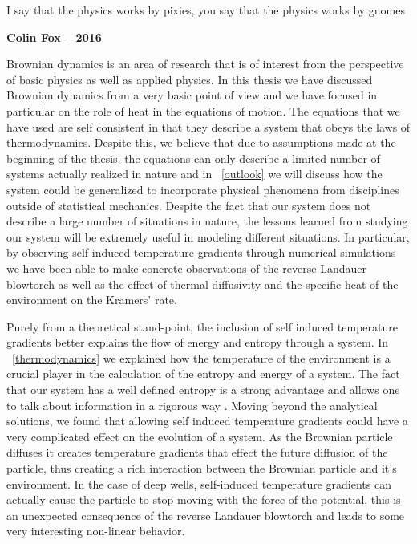 \epigraph{I say that the physics works by pixies, you say that the physics works by gnomes}{\textbf{Colin Fox -- 2016}}

Brownian dynamics is an area of research that is of interest from the perspective of basic physics as well as applied physics. In this thesis we have discussed Brownian dynamics from a very basic point of view and we have focused in particular on the role of heat in the equations of motion. The equations that we have used are self consistent in that they describe a system that obeys the laws of thermodynamics. Despite this, we believe that due to assumptions made at the beginning of the thesis, the equations can only describe a limited number of systems actually realized in nature and in ~\autoref{outlook} we will discuss how the system could be generalized to incorporate physical phenomena from disciplines outside of statistical mechanics. Despite the fact that our system does not describe a large number of situations in nature, the lessons learned from studying our system will be extremely useful in modeling different situations. In particular, by observing self induced temperature gradients through numerical simulations we have been able to make concrete observations of the reverse Landauer blowtorch as well as the effect of thermal diffusivity and the specific heat of the environment on the Kramers' rate.  

Purely from a theoretical stand-point, the inclusion of self induced temperature gradients better explains the flow of energy and entropy through a system. In ~\autoref{thermodynamics} we explained how the temperature of the environment is a crucial player in the calculation of the entropy and energy of a system. The fact that our system has a well defined entropy is a strong advantage and allows one to talk about information in a rigorous way \cite{Landauer1961,MyersCelebranoKrishnan2015}. Moving beyond the analytical solutions, we found that allowing self induced temperature gradients could have a very complicated effect on the evolution of a system. As the Brownian particle diffuses it creates temperature gradients that effect the future diffusion of the particle, thus creating a rich interaction between the Brownian particle and it's environment. In the case of deep wells, self-induced temperature gradients can actually cause the particle to stop moving with the force of the potential, this is an unexpected consequence of the reverse Landauer blowtorch and leads to some very interesting non-linear behavior.


